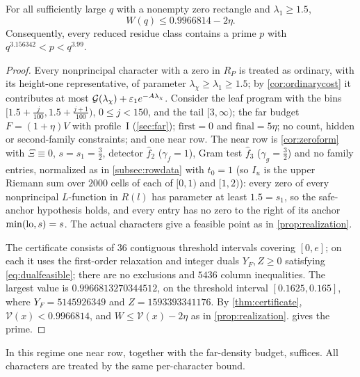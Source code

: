 \begin{theorem}\label{thm:large}
For all sufficiently large $q$ with a nonempty zero rectangle and $\lambda_1\ge1.5$,
\[
  W(q)\le0.9966814-2\eta.
\]
Consequently, every reduced residue class contains a prime $p$ with
$q^{3.156342}<p<q^{3.99}$.
\end{theorem}

\begin{proof}
Every nonprincipal character with a zero in $R_P$ is treated as ordinary, with its height-one
representative, of parameter $\lambda_\chi\ge\lambda_1\ge1.5$; by \cref{cor:ordinarycost} it contributes at most
$\mathcal G(\lambda_\chi)+\varepsilon_1e^{-A\lambda_\chi}$. Consider the leaf program with the bins
$[1.5+\frac j{100},1.5+\frac{j+1}{100})$, $0\le j<150$, and the tail $[3,\infty)$; the far budget
$F=(1+\eta)V$ with profile~I (\cref{sec:far}); $\mathrm{first}=0$ and $\mathrm{final}=5\eta$; no count, hidden or second-family
constraints; and one near row. The near row is \cref{cor:zeroform} with $\Xi\equiv0$, $s=s_1=\frac32$,
detector $\hat f_2$ ($\gamma_f=1$), Gram test $\hat f_3$ ($\gamma_g=\frac32$) and no family entries, normalized as in
\cref{subsec:rowdata} with $t_0=1$ (so $I_u$ is the upper Riemann sum over $2000$ cells of each of
$[0,1)$ and $[1,2)$): every zero of every
nonprincipal $L$-function in $R(l)$ has parameter at least $1.5=s_1$, so the safe-anchor hypothesis
holds, and every entry has no zero to the right of its anchor $\min(\mathrm{lo},s)=s$. The actual characters
give a feasible point as in \cref{prop:realization}.

The certificate consists of $36$ contiguous threshold intervals covering $[0,e]$; on each it uses the
first-order relaxation and integer duals $Y_F,Z\ge0$ satisfying \eqref{eq:dualfeasible}; there are no
exclusions and $5436$ column inequalities. The largest value is
$0.9966813270344512$, on the threshold interval $[0.1625,0.165]$, where $Y_F=5145926349$ and
$Z=1593393341176$. By \cref{thm:certificate}, $\mathcal V(x)<0.9966814$, and $W\le\mathcal V(x)-2\eta$ as in
\cref{prop:realization}.  gives the prime.
\end{proof}

In this regime one near row, together with the far-density budget, suffices.
All characters are treated by the same per-character bound.
